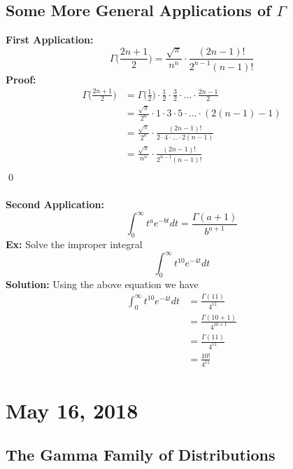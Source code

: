 \documentclass{article}
\newcommand{\x}{\cdot}
\newcommand{\Ga}{\Gamma}
\begin{document}
\subsection{Some More General Applications of $\Ga$}
\textbf{First Application:}
\[\Ga\bigg(\frac{2n+1}{2}\bigg) = \frac{\sqrt{\pi}}{n^{n}}\x \frac{(2n-1)!}{2^{n-1}(n-1)!}\]
\textbf{Proof:}
\begin{align*}
\Ga\bigg(\frac{2n+1}{2}\bigg) &= \Ga\bigg(\frac{1}{2}\bigg)\x \frac{1}{2} \x \frac{3}{2}\x \dots \x \frac{2n-1}{2}\\
						&= \frac{\sqrt{\pi}}{2^{n}}\x 1\x 3\x 5\x \dots \x (2(n-1)-1)\\
						&= \frac{\sqrt{\pi}}{2^{n}}\x \frac{(2n-1)!}{2\x 4\x \dots\x 2(n-1)}\\
						&= \frac{\sqrt{\pi}}{n^{n}}\x \frac{(2n-1)!}{2^{n-1}(n-1)!}\\
\end{align*}
\qed\\\\
\textbf{Second Application:}
\[\int_{0}^{\infty} t^{a}e^{-bt} dt = \frac{\Ga(a+1)}{b^{a+1}}\]
\textbf{Ex:} Solve the improper integral
\[\int_{0}^{\infty} t^{10}e^{-4t} dt\]
\textbf{Solution:} Using the above equation we have
\begin{align*}
\int_{0}^{\infty} t^{10}e^{-4t} dt & =  \frac{\Ga(11)}{4^{11}}\\
							& =  \frac{\Ga(10+1)}{4^{10+1}}\\
							& =  \frac{\Ga(11)}{4^{11}}\\
							& =  \frac{10!}{4^{11}}
\end{align*}
\newpage


\section{May 16, 2018}
\subsection{The Gamma Family of Distributions}
\end{document}
